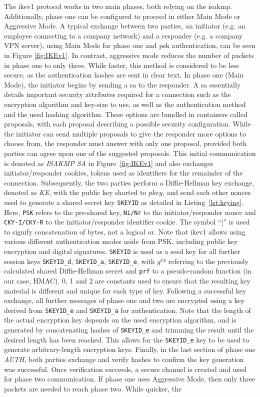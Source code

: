 The \ac{ike}v1 protocol works in two main phases, both relying on the \ac{isakmp}. Additionally, phase one can be configured to proceed in either Main Mode or Aggressive Mode. A typical exchange between two parties, an initiator (e.g. an employee connecting to a company network) and a responder (e.g. a company VPN server), using Main Mode for phase one and \ac{psk} authentication, can be seen in Figure \ref{fig:IKEv1}. In contrast, aggressive mode reduces the number of packets in phase one to only three. While faster, this method is considered to be less secure, as the authentication hashes are sent in clear text. In phase one (Main Mode), the initiator begins by sending a \ac{sa} to the responder. A \ac{sa} essentially details important security attributes required for a connection such as the encryption algorithm and key-size to use, as well as the authentication method and the used hashing algorithm. These options are bundled in containers called proposals, with each proposal describing a possible security configuration. While the initiator can send multiple proposals to give the responder more options to choose from, the responder must answer with only one proposal, provided both parties can agree upon one of the suggested proposals. This initial communication is denoted as \emph{ISAKMP SA} in Figure~\ref{fig:IKEv1} and also exchanges initiator/responder cookies, tokens used as identifiers for the remainder of the connection. Subsequently, the two parties perform a Diffie-Hellman key exchange, denoted as \emph{KE}, with the public key shorted to $pkey$, and send each other nonces used to generate a shared secret key \texttt{SKEYID} as detailed in Listing~\ref{lst:keying}. Here, \texttt{PSK} refers to the pre-shared key, \texttt{Ni/Nr} to the initiator/responder nonce and \texttt{CKY-I/CKY-R} to the initiator/responder identifier cookie. The symbol ``|'' is used to signify concatenation of bytes, not a logical or. Note that \ac{ike}v1 allows using various different authentication modes aside from PSK, including public key encryption and digital signatures. \texttt{SKEYID} is used as a seed key for all further session keys \texttt{SKEYID\_d}, \texttt{SKEYID\_a}, \texttt{SKEYID\_e}, with $g^{xy}$ referring to the previously calculated shared Diffie-Hellman secret and \texttt{prf} to a pseudo-random function (in our case, HMAC). 0, 1 and 2 are constants used to ensure that the resulting key material is different and unique for each type of key. Following a successful key exchange, all further messages of phase one and two are encrypted using a key derived from \texttt{SKEYID\_e} and \texttt{SKEYID\_a} for authentication. Note that the length of the actual encryption key depends on the used encryption algorithm, and is generated by concatenating hashes of \texttt{SKEYID\_e} and trimming the result until the desired length has been reached. This allows for the \texttt{SKEYID\_e} key to be used to generate arbitrary-length encryption keys. Finally, in the last section of phase one \emph{AUTH}, both parties exchange and verify hashes to confirm the key generation was successful. Once verification succeeds, a secure channel is created and used for phase two communication. If phase one uses Aggressive Mode, then only three packets are needed to reach phase two. While quicker, the 